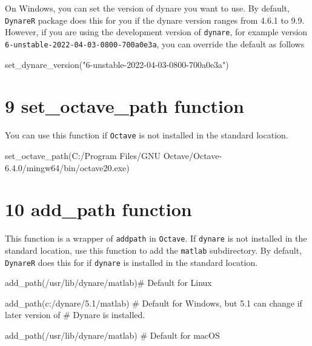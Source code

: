 \documentclass[
  letterpaper,
  DIV=11,
  numbers=noendperiod]{scrartcl}
\newenvironment{Shaded}{\begin{snugshade}}{\end{snugshade}}
\newcommand{\CommentTok}[1]{\textcolor[rgb]{0.37,0.37,0.37}{#1}}
\newcommand{\FunctionTok}[1]{\textcolor[rgb]{0.28,0.35,0.67}{#1}}
\newcommand{\NormalTok}[1]{\textcolor[rgb]{0.00,0.23,0.31}{#1}}
\newcommand{\StringTok}[1]{\textcolor[rgb]{0.13,0.47,0.30}{#1}}
\begin{document}
On Windows, you can set the version of dynare you want to use. By
default, \texttt{DynareR} package does this for you if the dynare
version ranges from 4.6.1 to 9.9. However, if you are using the
development version of \texttt{dynare}, for example version
\texttt{6-unstable-2022-04-03-0800-700a0e3a}, you can override the
default as follows

\begin{Shaded}
\begin{Highlighting}[]
\FunctionTok{set\_dynare\_version}\NormalTok{(}\StringTok{"6{-}unstable{-}2022{-}04{-}03{-}0800{-}700a0e3a"}\NormalTok{)}
\end{Highlighting}
\end{Shaded}

\hypertarget{set_octave_path-function}{%
\section{9 set\_octave\_path function}\label{set_octave_path-function}}

You can use this function if \texttt{Octave} is not installed in the
standard location.

\begin{Shaded}
\begin{Highlighting}[]
\FunctionTok{set\_octave\_path}\NormalTok{(}\StringTok{\textquotesingle{}C:/Program Files/GNU Octave/Octave{-}6.4.0/mingw64/bin/octave20.exe\textquotesingle{}}\NormalTok{)}
\end{Highlighting}
\end{Shaded}

\hypertarget{add_path-function}{%
\section{10 add\_path function}\label{add_path-function}}

This function is a wrapper of \texttt{addpath} in \texttt{Octave}. If
\texttt{dynare} is not installed in the standard location, use this
function to add the \texttt{matlab} subdirectory. By default,
\texttt{DynareR} does this for if \texttt{dynare} is installed in the
standard location.

\begin{Shaded}
\begin{Highlighting}[]
\FunctionTok{add\_path}\NormalTok{(}\StringTok{\textquotesingle{}/usr/lib/dynare/matlab\textquotesingle{}}\NormalTok{)}\CommentTok{\#  Default for Linux}

\FunctionTok{add\_path}\NormalTok{(}\StringTok{\textquotesingle{}c:/dynare/5.1/matlab\textquotesingle{}}\NormalTok{) }\CommentTok{\# Default for Windows, but 5.1 can change if later version of}
\CommentTok{\# \textasciigrave{}Dynare\textasciigrave{} is installed.}

\FunctionTok{add\_path}\NormalTok{(}\StringTok{\textquotesingle{}/usr/lib/dynare/matlab\textquotesingle{}}\NormalTok{) }\CommentTok{\# Default for macOS}
\end{Highlighting}
\end{Shaded}
\end{document}
